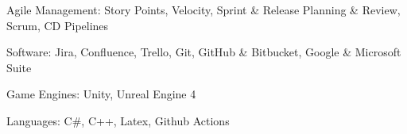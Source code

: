 


\begin{cvparagraph}
    
    \begin{cvitems}
        \text{}
        \item
        \item Agile Management: Story Points, Velocity, Sprint \& Release Planning \& Review, Scrum, CD Pipelines
        \item Software: Jira, Confluence, Trello, Git, GitHub \& Bitbucket, Google \& Microsoft Suite
        \item Game Engines: Unity, Unreal Engine 4
        \item Languages: C\#, C++, Latex, Github Actions
    \end{cvitems}

\end{cvparagraph}